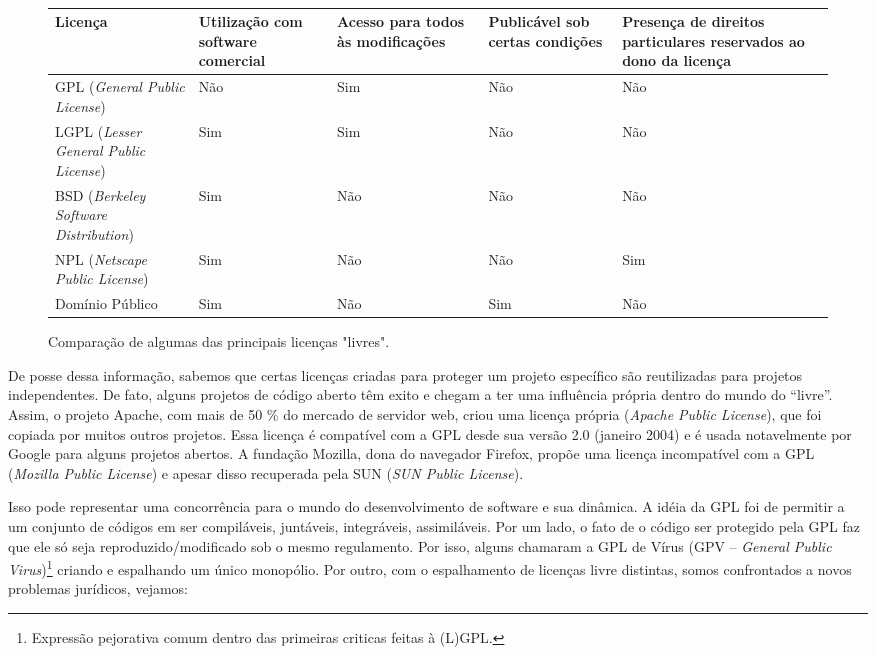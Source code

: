 \begin{figure}[htb]
\begin{center}
\caption{Comparação de algumas das principais licenças "livres".} \label{fig1.3}
\\
\begin{tabular}{|p{4cm}|p{2cm}|p{2cm}|p{2cm}|p{2cm}|}
\hline
Licença & Utilização com software comercial & Acesso para todos às modificações & Publicável sob certas condições & Presença de direitos particulares reservados ao dono da licença \\
\hline
GPL (\emph{General Public License}) & Não & Sim & Não & Não \\
\hline
LGPL (\emph{Lesser General Public License}) & Sim & Sim & Não & Não \\
\hline
BSD (\emph{Berkeley Software Distribution}) & Sim & Não & Não & Não \\
\hline
NPL (\emph{Netscape Public License}) & Sim & Não & Não & Sim \\
\hline
Domínio Público & Sim & Não & Sim & Não \\
\hline

\end{tabular}
\end{center}
\end{figure}


De posse dessa informação, sabemos que certas licenças criadas para proteger um projeto específico são reutilizadas para projetos independentes. De fato, alguns projetos de código aberto têm exito e chegam a ter uma influência própria dentro do mundo do “livre”. Assim, o projeto Apache, com mais de 50 \% do mercado de servidor web, criou uma licença própria (\emph{Apache Public License}), que foi copiada por muitos outros projetos. Essa licença é compatível com a GPL desde sua versão 2.0 (janeiro 2004) e é usada notavelmente por Google para alguns projetos abertos. A fundação Mozilla, dona do navegador Firefox, propõe uma licença incompatível com a GPL (\emph{Mozilla Public License}) e apesar disso recuperada pela SUN (\emph{SUN Public License}).

Isso pode representar uma concorrência para o mundo do desenvolvimento de software e sua dinâmica. A idéia da GPL foi de permitir a um conjunto de códigos em ser compiláveis, juntáveis, integráveis, assimiláveis. Por um lado, o fato de o código ser protegido pela GPL faz que ele só seja reproduzido/modificado sob o mesmo regulamento. Por isso, alguns chamaram a GPL de Vírus (GPV – \emph{General Public Virus})\footnote{Expressão pejorativa comum dentro das primeiras criticas feitas à (L)GPL.} criando e espalhando um único monopólio. Por outro, com o espalhamento de licenças livre distintas, somos confrontados a novos problemas jurídicos, vejamos:

